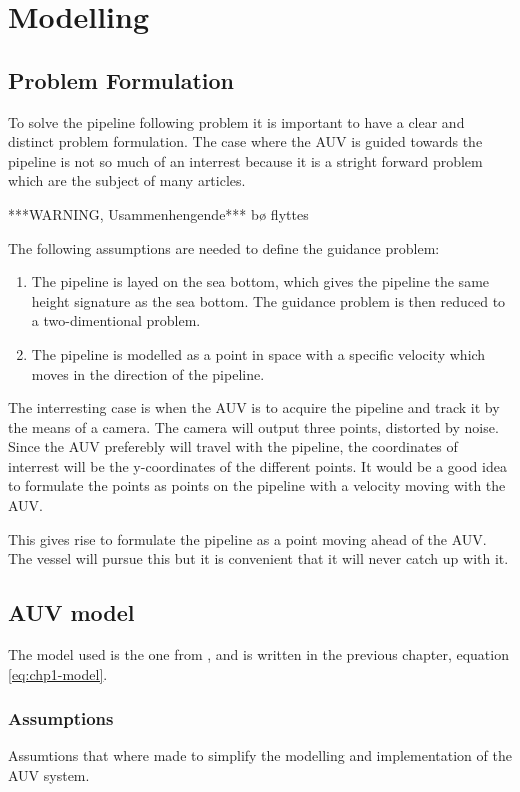 \chapter{Modelling}

\section{Problem Formulation}
\label{chap2:problem}
	To solve the pipeline following problem it is important to have a clear and distinct problem formulation. 
	The case where the AUV is guided towards the pipeline is not so much of an interrest because it is a stright 
	forward problem which are the subject of many articles. 

	***WARNING, Usammenhengende*** bø flyttes

	The following assumptions are needed to define the guidance problem:
		\begin{enumerate}
			\item The pipeline is layed on the sea bottom, which gives the pipeline the same
			height signature as the sea bottom. The guidance problem is then reduced to a
			two-dimentional problem.
			\item The pipeline is modelled as a point in space with a specific velocity which
			moves in the direction of the pipeline.
		\end{enumerate}

	The interresting case is when the AUV is to acquire the pipeline and track it by the means of a camera. The
	camera will output three points, distorted by noise. Since the AUV preferebly will travel with the
	pipeline, the coordinates of interrest will be the y-coordinates of the different points. It would be
	a good idea to formulate the points as points on the pipeline with a velocity moving with the AUV.

	This gives rise to formulate the pipeline as a point moving ahead of the AUV. The vessel will pursue
	this but it is convenient that it will never catch up with it.


\section{AUV model}
	The model used is the one from \cite{fossen}, and is written in the previous chapter, equation \eqref{eq:chp1-model}.
	
	\subsection{Assumptions}
	Assumtions that where made to simplify the modelling and implementation of the AUV system.
